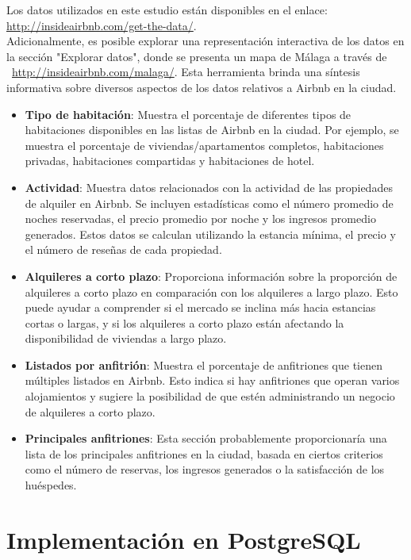 Los datos utilizados en este estudio están disponibles en el enlace: \href{http://insideairbnb.com/get-the-data/}{http://insideairbnb.com/get-the-data/}.\\
Adicionalmente, es posible explorar una representación interactiva de los datos en la sección "Explorar datos", donde se presenta un mapa de Málaga a través de \ \href{http://insideairbnb.com/malaga/}{http://insideairbnb.com/malaga/}. Esta herramienta brinda una síntesis informativa sobre diversos aspectos de los datos relativos a Airbnb en la ciudad.
\begin{itemize}
  \item \textbf{Tipo de habitación}: Muestra el porcentaje de diferentes tipos de habitaciones disponibles en las listas de Airbnb en la ciudad. Por ejemplo, se muestra el porcentaje de viviendas/apartamentos completos, habitaciones privadas, habitaciones compartidas y habitaciones de hotel.
  \item \textbf{Actividad}: Muestra datos relacionados con la actividad de las propiedades de alquiler en Airbnb. Se incluyen estadísticas como el número promedio de noches reservadas, el precio promedio por noche y los ingresos promedio generados. Estos datos se calculan utilizando la estancia mínima, el precio y el número de reseñas de cada propiedad.
  \item \textbf{Alquileres a corto plazo}: Proporciona información sobre la proporción de alquileres a corto plazo en comparación con los alquileres a largo plazo. Esto puede ayudar a comprender si el mercado se inclina más hacia estancias cortas o largas, y si los alquileres a corto plazo están afectando la disponibilidad de viviendas a largo plazo.
  \item \textbf{Listados por anfitrión}: Muestra el porcentaje de anfitriones que tienen múltiples listados en Airbnb. Esto indica si hay anfitriones que operan varios alojamientos y sugiere la posibilidad de que estén administrando un negocio de alquileres a corto plazo.
  \item \textbf{Principales anfitriones}: Esta sección probablemente proporcionaría una lista de los principales anfitriones en la ciudad, basada en ciertos criterios como el número de reservas, los ingresos generados o la satisfacción de los huéspedes.
\end{itemize}

\newpage
\section{Implementación en PostgreSQL}
